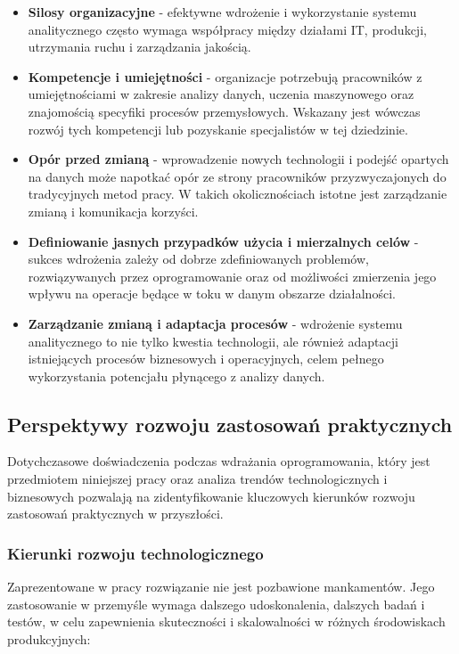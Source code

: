 \begin{itemize}
    \item \textbf{Silosy organizacyjne} - efektywne wdrożenie i wykorzystanie systemu analitycznego często wymaga współpracy między działami IT, produkcji, utrzymania ruchu i zarządzania jakością.
    \item \textbf{Kompetencje i umiejętności} - organizacje potrzebują pracowników z umiejętnościami w zakresie analizy danych, uczenia maszynowego oraz znajomością specyfiki procesów przemysłowych. Wskazany jest wówczas rozwój tych kompetencji lub pozyskanie specjalistów w tej dziedzinie.
    \item \textbf{Opór przed zmianą} - wprowadzenie nowych technologii i podejść opartych na danych może napotkać opór ze strony pracowników przyzwyczajonych do tradycyjnych metod pracy. W takich okolicznościach istotne jest zarządzanie zmianą i komunikacja korzyści.
    \item \textbf{Definiowanie jasnych przypadków użycia i mierzalnych celów} - sukces wdrożenia zależy od dobrze zdefiniowanych problemów, rozwiązywanych przez oprogramowanie oraz od możliwości zmierzenia jego wpływu na operacje będące w toku w danym obszarze działalności.
    \newpage
    \item \textbf{Zarządzanie zmianą i adaptacja procesów} - wdrożenie systemu analitycznego to nie tylko kwestia technologii, ale również adaptacji istniejących procesów biznesowych i operacyjnych, celem pełnego wykorzystania potencjału płynącego z analizy danych.
\end{itemize}

\subsection{Perspektywy rozwoju zastosowań praktycznych}
\label{subsec:perspektywy_rozwoju}

Dotychczasowe doświadczenia podczas wdrażania oprogramowania, który jest przedmiotem niniejszej pracy oraz analiza trendów technologicznych i biznesowych pozwalają na zidentyfikowanie kluczowych kierunków rozwoju zastosowań praktycznych w przyszłości.

\subsubsection{Kierunki rozwoju technologicznego}
\label{subsubsec:kierunki_rozwoju_tech}

Zaprezentowane w pracy rozwiązanie nie jest pozbawione mankamentów. Jego zastosowanie w przemyśle wymaga dalszego udoskonalenia, dalszych badań i testów, w celu zapewnienia skuteczności i skalowalności w różnych środowiskach produkcyjnych:

